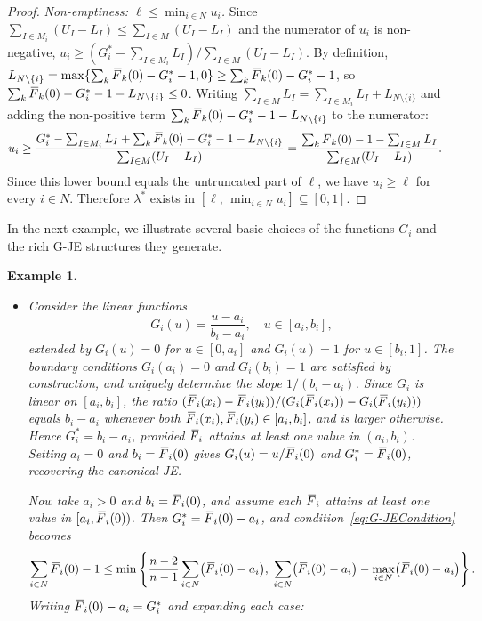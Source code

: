 \documentclass[letterpaper,12pt]{article}
\numberwithin{equation}{section}
\newtheorem{example}[theorem]{Example}
\newcommand{\N}{{N}}
\newcommand{\M}{{M}}
\newcommand{\I}{{I}}
\newcommand{\F}{\,\overline{\kern-0.175em F\kern-0em}}
\begin{document}
{\begin{proof}
\smallskip
\noindent\textit{Non-emptiness: $\ell\le\min_{i\in\N}u_i$.}
Since $\sum_{\I\in\M_i}(U_\I-L_\I)\le\sum_{\I\in\M}(U_\I-L_\I)$ and the
numerator of $u_i$ is non-negative, $u_i\ge(G_i^*-\sum_{\I\in\M_i}L_\I)/
\sum_{\I\in\M}(U_\I-L_\I)$.
By definition, $L_{\N\setminus\{i\}}=\max\{\sum_k\F_k(0)-G_i^*-1,0\}\ge
\sum_k\F_k(0)-G_i^*-1$, so
$\sum_k\F_k(0)-G_i^*-1-L_{\N\setminus\{i\}}\le0$. Writing
$\sum_{\I\in\M}L_\I=\sum_{\I\in\M_i}L_\I+L_{\N\setminus\{i\}}$ and adding
the non-positive term $\sum_k\F_k(0)-G_i^*-1-L_{\N\setminus\{i\}}$ to the
numerator:
\begin{align*}
u_i
&\ge\frac{G_i^*-\sum_{\I\in\M_i}L_\I
         +\sum_k\F_k(0)-G_i^*-1-L_{\N\setminus\{i\}}}
        {\sum_{\I\in\M}(U_\I-L_\I)}
=\frac{\sum_k\F_k(0)-1-\sum_{\I\in\M}L_\I}{\sum_{\I\in\M}(U_\I-L_\I)}.
\end{align*}
Since this lower bound equals the untruncated part of $\ell$, we have
$u_i\ge\ell$ for every $i\in\N$. Therefore $\lambda^*$ exists in
$[\ell,\,\min_{i\in\N}u_i]\subseteq[0,1]$.
\end{proof}

In the next example, we illustrate several basic choices of the functions $G_i$
and the rich G-JE structures they generate.

\begin{example}
\label{ex:G-JE_example}
\mbox{}
\begin{itemize}

\item[(1)]
Consider the linear functions
\[
G_i(u)=\frac{u-a_i}{b_i-a_i},\quad u\in[a_i,b_i],
\]
extended by $G_i(u)=0$ for $u\in[0,a_i]$ and $G_i(u)=1$ for $u\in[b_i,1]$.
The boundary conditions $G_i(a_i)=0$ and $G_i(b_i)=1$ are satisfied by
construction, and uniquely determine the slope $1/(b_i-a_i)$. Since $G_i$ is
linear on $[a_i,b_i]$, the ratio $(\F_i(x_i)-\F_i(y_i))/
(G_i(\F_i(x_i))-G_i(\F_i(y_i)))$ equals $b_i-a_i$ whenever both
$\F_i(x_i),\F_i(y_i)\in[a_i,b_i]$, and is larger otherwise.
Hence $G_i^*=b_i-a_i$, provided $\F_i$ attains at least one value in
$(a_i,b_i)$. Setting $a_i=0$ and $b_i=\F_i(0)$ gives $G_i(u)=u/\F_i(0)$ and
$G_i^*=\F_i(0)$, recovering the canonical JE.

Now take $a_i>0$ and $b_i=\F_i(0)$, and assume each $\F_i$ attains at least one
value in $[a_i,\F_i(0))$. Then $G_i^*=\F_i(0)-a_i$, and
condition~\eqref{eq:G-JECondition} becomes
\[
\sum_{i\in\N}\F_i(0)-1
\le\min\left\{
\frac{n-2}{n-1}\sum_{i\in\N}\bigl(\F_i(0)-a_i\bigr),\;
\sum_{i\in\N}\bigl(\F_i(0)-a_i\bigr)-\max_{i\in\N}\bigl(\F_i(0)-a_i\bigr)
\right\}.
\]
Writing $\F_i(0)-a_i = G_i^*$ and expanding each case:


\end{itemize}
\end{example}}
\end{document}
